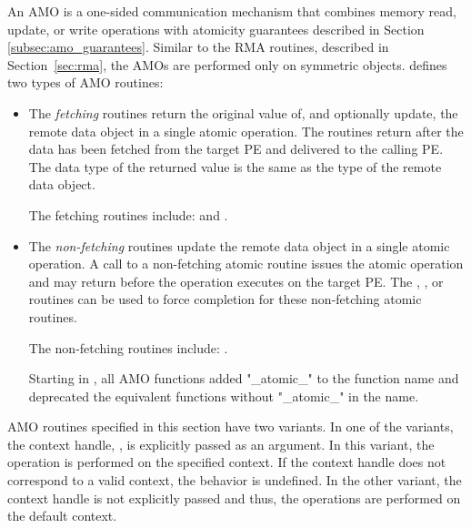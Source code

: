 An \ac{AMO} is a one-sided communication mechanism that combines memory read,
update, or write operations with atomicity guarantees described in Section~%
\ref{subsec:amo_guarantees}.  Similar to the \ac{RMA} routines, described in
Section~\ref{sec:rma}, the \acp{AMO} are performed only on symmetric objects.
\openshmem defines two types of \ac{AMO} routines:

\begin{itemize}

\item
  The \emph{fetching} routines return the original value of, and optionally
  update, the remote data object in a single atomic operation.  The routines
  return after the data has been fetched from the target \ac{PE} and delivered
  to the calling \ac{PE}.
  The data type of the returned value is the same as the type of
  the remote data object.

  The fetching routines include:
   and
  .

\item
  The \emph{non-fetching} routines update the remote data object in a single
  atomic operation.  A call to a non-fetching atomic routine issues the atomic
  operation and may return before the operation executes on the target \ac{PE}.
  The , , or 
  routines can be used to force completion for these non-fetching
  atomic routines.

  The non-fetching routines include:
  .

\begin{DeprecateBlock}

Starting in \openshmem[1.4], all \ac{AMO} functions added "\_atomic\_" to the function 
name and deprecated the equivalent functions without "\_atomic\_" in the name.

\end{DeprecateBlock}

\end{itemize}

\openshmem \ac{AMO} routines specified in this section have two variants. In
one of the variants, the context handle, , is explicitly passed as
an argument. In this variant, the operation is performed on the specified 
context. If the context handle  does not correspond to a valid
context, the behavior is undefined. In the other variant, the context handle
is not explicitly passed and thus, the operations are performed on the
default context.

